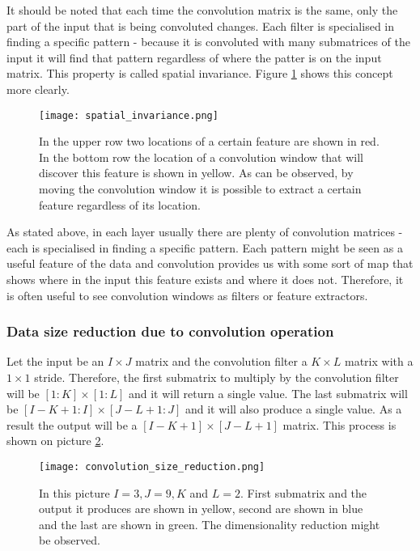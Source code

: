\documentclass[a4paper,10pt]{report}
\begin{document}
	  It should be noted that each time the convolution matrix is the same, only the part of the input that is being convoluted changes. Each filter is specialised in finding a specific pattern - because it is convoluted with many submatrices of the input it will find that pattern regardless of where the patter is on the input matrix. This property is called spatial invariance. Figure \ref{fig:spatial_invariance} shows this concept more clearly. 
	  	  
	  \begin{figure}[h!]
	    \centering
	    \texttt{[image: spatial\_invariance.png]}
	    \caption{In the upper row two locations of a certain feature are shown in red. In the bottom row the location of a convolution window that will discover this feature is shown in yellow. As can be observed, by moving the convolution window it is possible to extract a certain feature regardless of its location.}
	    \label{fig:spatial_invariance}
	  \end{figure} 
	  
	  
	  As stated above, in each layer usually there are plenty of convolution matrices - each is specialised in finding a specific pattern. Each pattern might be seen as a useful feature of the data and convolution provides us with some sort of map that shows where in the input this feature exists and where it does not. Therefore, it is often useful to see convolution windows as filters or feature extractors. 
	  
	  \subsubsection{Data size reduction due to convolution operation}
	  
 	  Let the input be an $I\times J$ matrix and the convolution filter a $K\times L$ matrix with a $1\times1$ stride. Therefore, the first submatrix to multiply by the convolution filter will be $[1:K]\times[1:L]$ and it will return a single value. The last submatrix will be $[I-K+1:I]\times[J-L+1:J]$ and it will also produce a  single value. As a result the output will be a $[I-K+1]\times[J-L+1]$ matrix. This process is shown on picture \ref{fig:convolution_size_reduction}. 
	  
	  
	  \begin{figure}[h!]
	    \centering
	    \texttt{[image: convolution\_size\_reduction.png]}
	    \caption{In this picture $I = 3, J = 9, K$ and $L = 2$. First submatrix and the output it produces are shown in yellow, second are shown in blue and the last are shown in green. The dimensionality reduction might be observed.}
	    \label{fig:convolution_size_reduction}
	  \end{figure} 
	  
\end{document}
